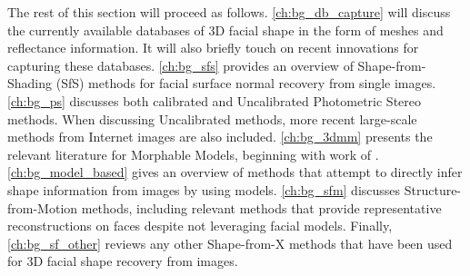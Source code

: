 The rest of this section will proceed as follows. \cref{ch:bg_db_capture} will
discuss the currently available databases of 3D facial shape in the form
of meshes and reflectance information. It will also briefly touch on recent
innovations for capturing these databases. \cref{ch:bg_sfs} provides an overview
of Shape-from-Shading (SfS) methods for facial surface normal recovery from
single images. \cref{ch:bg_ps} discusses both calibrated and 
Uncalibrated Photometric Stereo methods. When discussing Uncalibrated methods,
more recent large-scale methods from Internet images are also included. 
\cref{ch:bg_3dmm} presents the relevant literature for Morphable Models,
beginning with work of \citet{RefWorks:96}. \cref{ch:bg_model_based} gives an
overview of methods that attempt to directly infer shape information from images
by using models. \cref{ch:bg_sfm} discusses Structure-from-Motion methods,
including relevant methods that provide representative reconstructions
on faces despite not leveraging facial models. Finally, \cref{ch:bg_sf_other}
reviews any other Shape-from-X methods that have been used for 3D facial
shape recovery from images.







\stopcontents[chapters]

